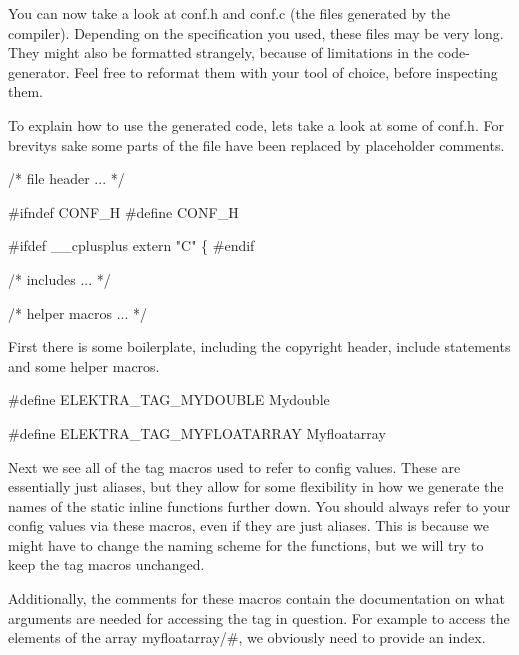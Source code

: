 You can now take a look at {\ttfamily conf.\+h} and {\ttfamily conf.\+c} (the files generated by the compiler). Depending on the specification you used, these files may be very long. They might also be formatted strangely, because of limitations in the code-\/generator. Feel free to reformat them with your tool of choice, before inspecting them.

To explain how to use the generated code, lets take a look at some of {\ttfamily conf.\+h}. For brevity\textquotesingle{}s sake some parts of the file have been replaced by placeholder comments.


\begin{DoxyCode}
\textcolor{comment}{/* file header ... */}

\textcolor{preprocessor}{#ifndef CONF\_H}
\textcolor{preprocessor}{#define CONF\_H}

\textcolor{preprocessor}{#ifdef \_\_cplusplus}
\textcolor{keyword}{extern} \textcolor{stringliteral}{"C"} \{
\textcolor{preprocessor}{#endif}

\textcolor{comment}{/* includes ... */}

\textcolor{comment}{/* helper macros ... */}
\end{DoxyCode}


First there is some boilerplate, including the copyright header, include statements and some helper macros.


\begin{DoxyCode}

\textcolor{preprocessor}{#define ELEKTRA\_TAG\_MYDOUBLE Mydouble}

\textcolor{preprocessor}{#define ELEKTRA\_TAG\_MYFLOATARRAY Myfloatarray}
\end{DoxyCode}


Next we see all of the \textquotesingle{}tag macros\textquotesingle{} used to refer to config values. These are essentially just aliases, but they allow for some flexibility in how we generate the names of the {\ttfamily static inline} functions further down. You should always refer to your config values via these macros, even if they are just aliases. This is because we might have to change the naming scheme for the functions, but we will try to keep the tag macros unchanged.

Additionally, the comments for these macros contain the documentation on what arguments are needed for accessing the tag in question. For example to access the elements of the array {\ttfamily myfloatarray/\#}, we obviously need to provide an index.


